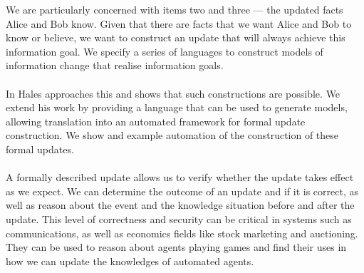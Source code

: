 We are particularly concerned with items two and  three --- the updated facts Alice and Bob know.
Given that there are facts that we want Alice and Bob to know or believe, we want to construct an
update that will always achieve this information goal. We specify a series of languages to
construct models of information change that realise information goals.\\
\\
In \cite{hales13synthesis} Hales approaches this and shows that such constructions are possible.
We extend his work by providing a language that can be used to generate models, allowing
translation into an automated framework for formal update construction. We show and example
automation of the construction of these formal updates.\\
\\
A formally described update allows us to verify whether the update takes effect as we expect. We can
determine the outcome of an update and if it is correct, as well as reason about the event and the
knowledge situation before and after the update. This level of correctness and security can be
critical in systems such as communications, as well as economics fields like stock marketing and
auctioning. They can be used to reason about agents playing games and find their uses in how we can
update the knowledges of automated agents.

